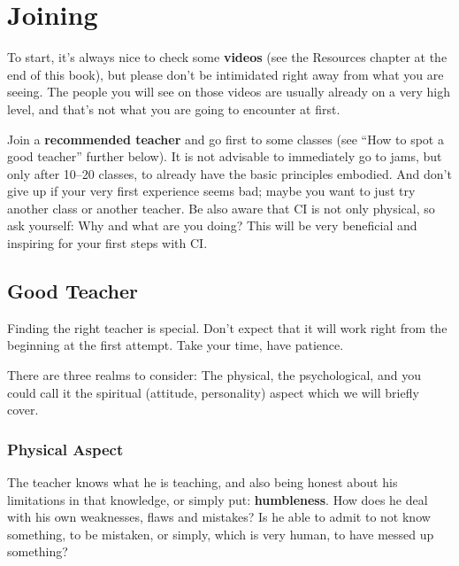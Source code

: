 \section{Joining}\label{sec:joining}

To start, it's always nice to check some \textbf{videos} (see the Resources chapter at the end of this book), but please don't be intimidated right away from what you are seeing.
The people you will see on those videos are usually already on a very high level, and that's not what you are going to encounter at first.

Join a \textbf{recommended teacher} and go first to some classes (see ``How to spot a good teacher'' further below).
It is not advisable to immediately go to jams, but only after 10--20 classes, to already have the basic principles embodied.
And don't give up if your very first experience seems bad; maybe you want to just try another class or another teacher.
Be also aware that CI is not only physical, so ask yourself: Why and what are you doing?
This will be very beneficial and inspiring for your first steps with CI\@.

\subsection{Good Teacher}\label{subsec:good-teacher}

Finding the right teacher is special.
Don’t expect that it will work right from the beginning at the first attempt.
Take your time, have patience.

There are three realms to consider: The physical, the psychological, and you could call it the spiritual (attitude, personality) aspect which we will briefly cover.

\subsubsection{Physical Aspect}

The teacher knows what he is teaching, and also being honest about his limitations in that knowledge, or simply put: \textbf{humbleness}.
How does he deal with his own weaknesses, flaws and mistakes?
Is he able to admit to not know something, to be mistaken, or simply, which is very human, to have messed up something?

